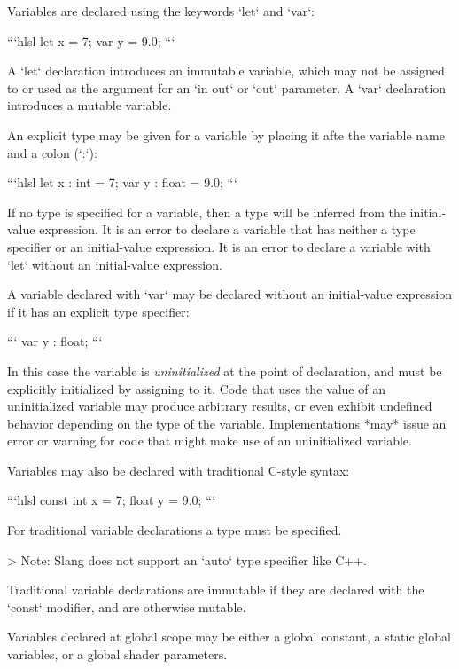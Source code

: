 

Variables are declared using the keywords `let` and `var`:

```hlsl
let x = 7;
var y = 9.0;
```

A `let` declaration introduces an immutable variable, which may not be assigned to or used as the argument for an `in out` or `out` parameter.
A `var` declaration introduces a mutable variable.

An explicit type may be given for a variable by placing it afte the variable name and a colon (`:`):

```hlsl
let x : int = 7;
var y : float = 9.0;
```

If no type is specified for a variable, then a type will be inferred from the initial-value expression.
It is an error to declare a variable that has neither a type specifier or an initial-value expression.
It is an error to declare a variable with `let` without an initial-value expression.

A variable declared with `var` may be declared without an initial-value expression if it has an explicit type specifier:

```
var y : float;
```

In this case the variable is  \emph{uninitialized} at the point of declaration, and must be explicitly initialized by assigning to it.
Code that uses the value of an uninitialized variable may produce arbitrary results, or even exhibit undefined behavior depending on the type of the variable.
Implementations *may* issue an error or warning for code that might make use of an uninitialized variable.


Variables may also be declared with traditional C-style syntax:

```hlsl
const int x = 7;
float y = 9.0;
```

For traditional variable declarations a type must be specified.

> Note: Slang does not support an `auto` type specifier like C++.

Traditional variable declarations are immutable if they are declared with the `const` modifier, and are otherwise mutable.


Variables declared at global scope may be either a global constant, a static global variables, or a global shader parameters.


